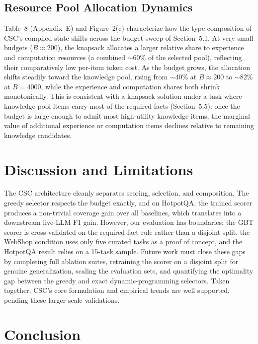 \documentclass{article}
\begin{document}
\subsection{Resource Pool Allocation Dynamics}

Table~8 (Appendix~E) and Figure~2(c) characterize how the type composition of CSC's compiled state shifts across the budget sweep of Section~5.1. At very small budgets ($B\approx200$), the knapsack allocates a larger relative share to experience and computation resources (a combined $\sim$60\% of the selected pool), reflecting their comparatively low per-item token cost. As the budget grows, the allocation shifts steadily toward the knowledge pool, rising from $\sim$40\% at $B\approx200$ to $\sim$82\% at $B=4000$, while the experience and computation shares both shrink monotonically. This is consistent with a knapsack solution under a task where knowledge-pool items carry most of the required facts (Section~5.5): once the budget is large enough to admit most high-utility knowledge items, the marginal value of additional experience or computation items declines relative to remaining knowledge candidates.

\section{Discussion and Limitations}

The CSC architecture cleanly separates scoring, selection, and composition. The greedy selector respects the budget exactly, and on HotpotQA, the trained scorer produces a non-trivial coverage gain over all baselines, which translates into a downstream live-LLM F1 gain. However, our evaluation has boundaries: the GBT scorer is cross-validated on the required-fact rule rather than a disjoint split, the WebShop condition uses only five curated tasks as a proof of concept, and the HotpotQA result relies on a 15-task sample. Future work must close these gaps by completing full ablation suites, retraining the scorer on a disjoint split for genuine generalization, scaling the evaluation sets, and quantifying the optimality gap between the greedy and exact dynamic-programming selectors. Taken together, CSC's core formulation and empirical trends are well supported, pending these larger-scale validations.

\section{Conclusion}
\end{document}
